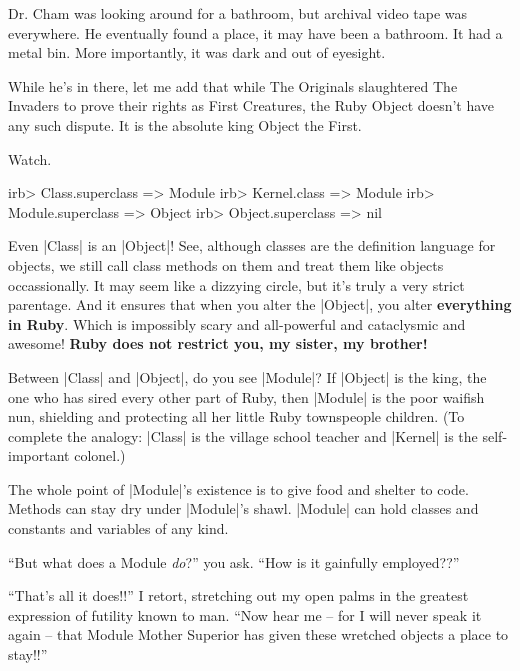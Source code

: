 \documentclass[12pt,twoside]{report}
\begin{document}
Dr. Cham was looking around for a bathroom, but archival video tape
was everywhere. He eventually found a place, it may have been a
bathroom.  It had a metal bin. More importantly, it was dark and out
of eyesight.

While he's in there, let me add that while The Originals slaughtered
The Invaders to prove their rights as First Creatures, the Ruby Object
doesn't have any such dispute.  It is the absolute king Object the
First.

Watch.


\begin{consolecode}

 irb> Class.superclass
   => Module
 irb> Kernel.class
   => Module
 irb> Module.superclass
   => Object
 irb> Object.superclass
   => nil

\end{consolecode}


Even \rubyinline|Class| is an
\rubyinline|Object|!  See, although classes are the
definition language for objects, we still call class methods on them
and treat them like objects occassionally.  It may seem like a
dizzying circle, but it's truly a very strict parentage.  And it
ensures that when you alter the \rubyinline|Object|,
you alter {\bf everything in Ruby}.  Which is impossibly scary and
all-powerful and cataclysmic and awesome!  {\bf Ruby does not restrict
  you, my sister, my brother!}

Between \rubyinline|Class| and
\rubyinline|Object|, do you see
\rubyinline|Module|?  If
\rubyinline|Object| is the king, the one who has sired
every other part of Ruby, then \rubyinline|Module| is
the poor waifish nun, shielding and protecting all her little Ruby
townspeople children.  (To complete the analogy:
\rubyinline|Class| is the village school teacher and
\rubyinline|Kernel| is the self-important colonel.)

The whole point of \rubyinline|Module|'s existence is
to give food and shelter to code.  Methods can stay dry under
\rubyinline|Module|'s shawl.
\rubyinline|Module| can hold classes and constants and
variables of any kind.

``But what does a Module {\em do}?'' you ask.  ``How is it gainfully
employed??''

``That's all it does!!'' I retort, stretching out my open palms in the
greatest expression of futility known to man.  ``Now hear me -- for I
will never speak it again -- that Module Mother Superior has given
these wretched objects a place to stay!!''
\end{document}
